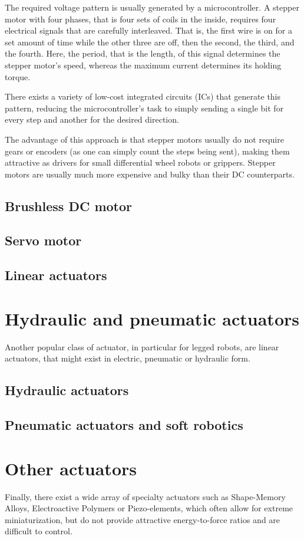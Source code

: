 The required voltage pattern is usually generated by a microcontroller. A stepper motor with four phases, that is four sets of coils in the inside, requires four electrical signals that are carefully interleaved. That is, the first wire is on for a set amount of time while the other three are off, then the second, the third, and the fourth. Here, the period, that is the length, of this signal determines the stepper motor's speed, whereas the maximum current determines its holding torque. 

There exists a variety of low-cost integrated circuits (ICs) that generate this pattern, reducing the microcontroller's task to simply sending a single bit for every step and another for the desired direction. 

The advantage of this approach is that stepper motors usually do not require gears or encoders (as one can simply count the steps being sent), making them attractive as drivers for small differential wheel robots or grippers. Stepper motors are usually much more expensive and bulky than their DC counterparts.

\subsection{Brushless DC motor}\label{sec:brushlessDC}
\subsection{Servo motor}
\subsection{Linear actuators}

\section{Hydraulic and pneumatic actuators}
Another popular class of actuator, in particular for legged robots, are linear actuators, that might exist in electric, pneumatic or hydraulic form. 

\subsection{Hydraulic actuators}
\subsection{Pneumatic actuators and soft robotics}
 
\section{Other actuators} 
 Finally, there exist a wide array of specialty actuators such as Shape-Memory Alloys, Electroactive Polymers or Piezo-elements, which often allow for extreme miniaturization, but do not provide attractive energy-to-force ratios and are difficult to control.
